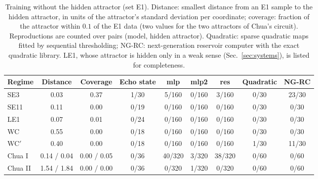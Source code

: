 \documentclass[aip,cha,reprint,amsmath,amssymb,longbibliography]{revtex4-2}
\theoremstyle{definition}
\begin{document}
\begin{table}
\caption{Training without the hidden attractor (set E1). Distance: smallest distance from an E1 sample to the hidden
attractor, in units of the attractor's standard deviation per coordinate; coverage: fraction of the attractor within $0.1$
of the E1 data (two values for the two attractors of Chua's circuit). Reproductions are counted over pairs (model, hidden
attractor). Quadratic: sparse quadratic maps fitted by sequential thresholding; NG-RC: next-generation reservoir computer
with the exact quadratic library. LE1, whose attractor is hidden only in a weak sense (Sec.~\ref{sec:systems}), is listed
for completeness.}
\label{tab:e1}
\begin{ruledtabular}
\begin{tabular}{lcccccccc}
Regime & Distance & Coverage & Echo state & mlp & mlp2 & res & Quadratic & NG-RC \\
\hline
SE3 & 0.03 & 0.37 & 1/30 & 5/160 & 0/160 & 3/160 & 0/30 & 23/30 \\
SE11 & 0.11 & 0.00 & 0/19 & 0/160 & 0/160 & 0/160 & 0/30 & 0/30 \\
LE1 & 0.07 & 0.01 & 0/24 & 0/160 & 0/160 & 0/160 & 0/30 & 0/30 \\
WC & 0.55 & 0.00 & 0/18 & 0/160 & 0/160 & 0/160 & 0/30 & 0/30 \\
WC$'$ & 0.40 & 0.00 & 0/18 & 0/160 & 0/160 & 0/160 & 1/30 & 11/30 \\
Chua I & 0.14 / 0.04 & 0.00 / 0.05 & 0/36 & 40/320 & 3/320 & 38/320 & 0/60 & 0/60 \\
Chua II & 1.54 / 1.84 & 0.00 / 0.00 & 0/36 & 0/320 & 1/320 & 0/320 & 0/60 & 0/60 \\
\end{tabular}
\end{ruledtabular}
\end{table}
\end{document}
